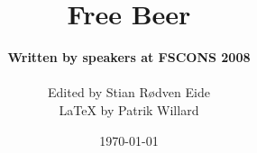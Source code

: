 \documentclass[a4paper,11pt,titlepage]{book}
\begin{document}
 
    \title{\Huge{Free Beer}}
    \author{\textbf{Written by speakers at FSCONS 2008}\\\\ Edited by Stian Rødven Eide\\ \LaTeX{} by Patrik Willard}
    \date{\today}


    \addtolength{\oddsidemargin}{0.85cm}
    \maketitle
    \addtolength{\oddsidemargin}{-0.85cm}

    \pagestyle{empty}
    
    \tableofcontents
    \newpage

    \mainmatter
    \pagestyle{plain}
    

    \appendix

    \backmatter
    
    
    

    \newpage
    \mbox{}
    \thispagestyle{empty}
\end{document}
